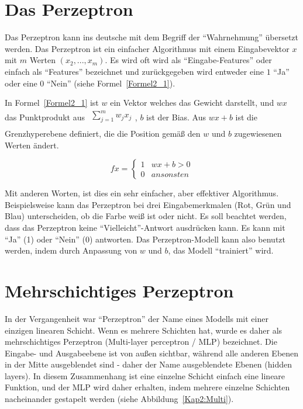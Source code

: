 \section{Das Perzeptron}
Das Perzeptron kann ins deutsche mit dem Begriff der \enquote{Wahrnehmung} übersetzt werden. Das Perzeptron ist ein einfacher Algorithmus mit einem Eingabevektor $x$ mit $m$ Werten $(x_2, ..., x_m)$. Es wird oft wird als \enquote{Eingabe-Features} oder einfach als \enquote{Features} bezeichnet und zurückgegeben wird entweder eine $1$ \enquote{Ja} oder eine $0$ \enquote{Nein} (siehe Formel~\ref{Formel2_1}).

In Formel~\ref{Formel2_1}  ist $w$ ein Vektor welches das Gewicht darstellt, und $wx$ das Punktprodukt aus $\begin{array}{l}
    {\textstyle \sum ^{m}_{j=1}} w_{j} x_{j} \\
  \end{array}$, $b$ ist der Bias.
Aus $wx + b$ ist die Grenzhyperebene definiert, die die Position gemäß den $w$ und $b$ zugewiesenen Werten ändert.

\begin{equation}
  fx=\begin{cases}
    1 & wx+b >0   \\
    0 & ansonsten
  \end{cases}
  \label{Formel2_1}
\end{equation}

Mit anderen Worten, ist dies ein sehr einfacher, aber effektiver Algorithmus. Beispielsweise kann das Perzeptron bei drei Eingabemerkmalen  (Rot, Grün und Blau) unterscheiden, ob die Farbe weiß ist oder nicht. Es soll beachtet werden, dass das Perzeptron keine \enquote{Vielleicht}-Antwort ausdrücken kann. Es kann mit \enquote{Ja} (1) oder \enquote{Nein} (0) antworten. Das Perzeptron-Modell kann also benutzt werden, indem durch Anpassung von $w$ und $b$, das Modell \enquote{trainiert} wird.


\section{Mehrschichtiges Perzeptron}
In der Vergangenheit war \enquote{Perzeptron} der Name eines Modells mit einer einzigen linearen Schicht. Wenn es mehrere Schichten hat, wurde es daher als mehrschichtiges Perzeptron (Multi-layer perceptron / MLP) bezeichnet. Die Eingabe- und Ausgabeebene  ist von außen sichtbar, während alle anderen Ebenen in der Mitte ausgeblendet sind - daher der Name ausgeblendete Ebenen (hidden layers). In diesem Zusammenhang ist eine einzelne Schicht einfach eine lineare Funktion, und der MLP wird daher erhalten, indem mehrere einzelne Schichten nacheinander gestapelt werden (siehe Abbildung~\ref{Kap2:Multi}).

